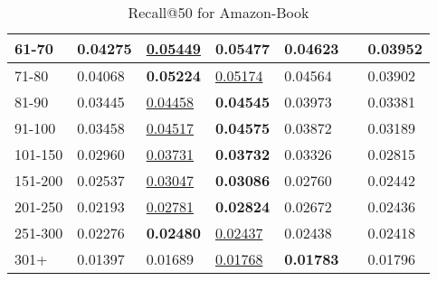 \begin{table*}[]
\begin{tabular}{|l|l|l|l|l|l|l|}
        61-70     & 0.04275                        & \underline{0.05449}            & \textbf{0.05477}               & 0.04623                        &                                & 0.03952                               \\ \hline
        71-80     & 0.04068                        & \textbf{0.05224}               & \underline{0.05174}            & 0.04564                        &                                & 0.03902                               \\ \hline
        81-90     & 0.03445                        & \underline{0.04458}            & \textbf{0.04545}               & 0.03973                        &                                & 0.03381                               \\ \hline
        91-100    & 0.03458                        & \underline{0.04517}            & \textbf{0.04575}               & 0.03872                        &                                & 0.03189                               \\ \hline
        101-150   & 0.02960                        & \underline{0.03731}            & \textbf{0.03732}               & 0.03326                        &                                & 0.02815                               \\ \hline
        151-200   & 0.02537                        & \underline{0.03047}            & \textbf{0.03086}               & 0.02760                        &                                & 0.02442                               \\ \hline
        201-250   & 0.02193                        & \underline{0.02781}            & \textbf{0.02824}               & 0.02672                        &                                & 0.02436                               \\ \hline
        251-300   & 0.02276                        & \textbf{0.02480}               & \underline{0.02437}            & 0.02438                        &                                & 0.02418                               \\ \hline
        301+      & 0.01397                        & 0.01689                        & \underline{0.01768}            & \textbf{0.01783}               &                                & 0.01796                               \\ \hline
    \end{tabular}
    \caption{Recall@50 for Amazon-Book}
\end{table*}
